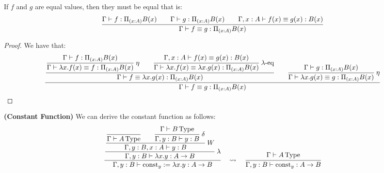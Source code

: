 \begin{lemma}
    \label{lemma:equal-function-eval-equal}
    If $f$ and $g$ are equal values, then they must be equal that is:
    \begin{equation*}
        \cfrac{\Gamma\vdash f:\Pi_{(x:A)}B(x)\qquad \Gamma\vdash g:\Pi_{(x:A)}B(x)\qquad \Gamma, x:A\vdash f(x)\equiv g(x):B(x)}{\Gamma\vdash f\equiv g:\Pi_{(x:A)}B(x)}
    \end{equation*}
\end{lemma}
\begin{dem}
\begin{proof}
    We have that:
    \begin{equation*}
        \cfrac{\cfrac{\cfrac{\Gamma\vdash f:\Pi_{(x:A)}B(x)}{\Gamma\vdash \lambda x.f(x)\equiv f:\Pi_{(x:A)}B(x)}\ \eta\qquad\cfrac{\Gamma, x:A\vdash f(x)\equiv g(x):B(x)}{\Gamma\vdash \lambda x.f(x)\equiv \lambda x.g(x):\Pi_{(x:A)}B(x)}\ \lambda\text{-eq}}{\Gamma\vdash f\equiv\lambda x.g(x):\Pi_{(x:A)}B(x)}\qquad\cfrac{\Gamma\vdash g:\Pi_{(x:A)}B(x)}{\Gamma\vdash \lambda x.g(x)\equiv g:\Pi_{(x:A)}B(x)}\ \eta}{\Gamma\vdash f\equiv g:\Pi_{(x:A)}B(x)}
    \end{equation*}
\end{proof}
\end{dem}

\begin{definition}{\textbf{(Constant Function)}}
    \label{def:const-funct}
    We can derive the constant function as follows:
    \begin{equation*}
        \cfrac{\cfrac{\cfrac{\cfrac{}{\Gamma\vdash A\type}\qquad\cfrac{\Gamma\vdash B\type}{\Gamma, y:B\vdash y:B}\ \delta}{\Gamma, y:B, x:A\vdash y:B}\ W}{\Gamma, y:B\vdash \lambda x.y:A\to B}\ \lambda}{\Gamma, y:B\vdash\operatorname{const}_y:=\lambda x.y:A\to B}\quad \rightsquigarrow\quad \cfrac{\Gamma\vdash A\type}{\Gamma, y:B\vdash\operatorname{const}_y:A\to B}
    \end{equation*}
\end{definition}

